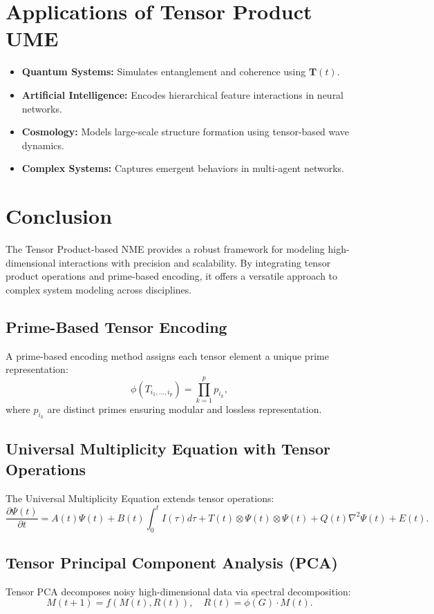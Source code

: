 \documentclass{article}
\theoremstyle{plain}
\begin{document}
\section{Applications of Tensor Product UME}
\begin{itemize}
    \item \textbf{Quantum Systems:} Simulates entanglement and coherence using \(\bm{T}(t)\).
    \item \textbf{Artificial Intelligence:} Encodes hierarchical feature interactions in neural networks.
    \item \textbf{Cosmology:} Models large-scale structure formation using tensor-based wave dynamics.
    \item \textbf{Complex Systems:} Captures emergent behaviors in multi-agent networks.
\end{itemize}

\section{Conclusion}
The Tensor Product-based NME provides a robust framework for modeling high-dimensional interactions with precision and scalability. By integrating tensor product operations and prime-based encoding, it offers a versatile approach to complex system modeling across disciplines.
\subsection{Prime-Based Tensor Encoding}
A prime-based encoding method assigns each tensor element a unique prime representation:
\begin{equation}
\phi(T_{i_1,\dots,i_p}) = \prod_{k=1}^{p} p_{i_k},
\end{equation}
where $p_{i_k}$ are distinct primes ensuring modular and lossless representation.

\subsection{Universal Multiplicity Equation with Tensor Operations}
The Universal Multiplicity Equation extends tensor operations:
\begin{equation}
\frac{\partial \Psi(t)}{\partial t} = A(t) \Psi(t) + B(t) \int_{0}^{t} I(\tau) d\tau + T (t) \otimes \Psi(t) \otimes \Psi(t) + Q(t) \nabla^2 \Psi(t) + E(t).
\end{equation}

\subsection{Tensor Principal Component Analysis (PCA)}
Tensor PCA decomposes noisy high-dimensional data via spectral decomposition:
\begin{equation}
M (t+1) = f(M (t), R(t)), \quad R(t) = \phi(G) \cdot M (t).
\end{equation}
\end{document}
